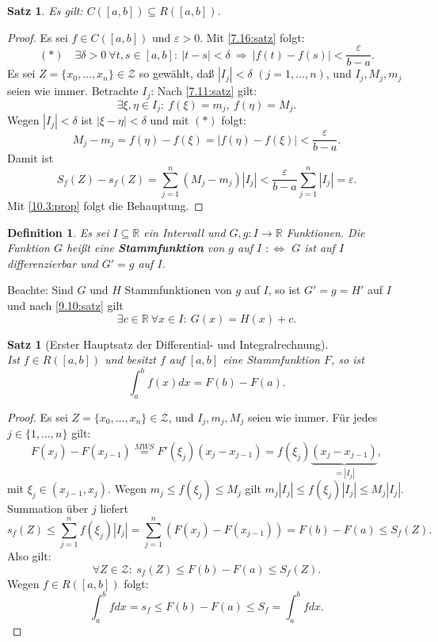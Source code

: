 \documentclass[12pt]{extreport} %
\newcommand{\R}{\mathbb{R}}
\theoremstyle{named}
\theoremstyle{itshape}
\newtheorem{satz}[unnamedtheorem]{Satz}
\newtheorem*{definition}{Definition}
\theoremstyle{normal}
\begin{document}
{\begin{satz} \label{10.5:satz}
	Es gilt: $C([a, b]) \subseteq R([a, b])$.
\end{satz}

\begin{proof}
	Es sei $f \in C([a, b])$ und $\varepsilon > 0$. Mit \ref{7.16:satz} folgt: 
	$$
	(\ast) \quad \exists \delta > 0~ \forall t, s \in [a, b]: ~ |t - s| < \delta ~ \Rightarrow  ~ |f(t) - f(s)| < \frac{\varepsilon}{b - a}.
	$$
	Es sei $Z = \{ x_{0}, \dotsc, x_{n} \} \in \mathcal{Z}$ so gewählt, da{\ss} $|I_{j}| < \delta$ $(j = 1, \dotsc, n)$, und $I_{j}, M_{j}, m_{j}$ seien wie immer.
	Betrachte $I_{j}$: Nach \ref{7.11:satz} gilt:
	$$ \exists \xi, \eta \in I_{j}: ~ f(\xi) = m_{j}, ~ f(\eta) = M_{j}. $$
	Wegen $|I_{j}| < \delta$ ist $|\xi - \eta| < \delta$ und mit $(\ast)$ folgt:
	$$ M_{j} - m_{j} = f(\eta) - f(\xi) = |f(\eta) - f(\xi)| < \frac{\varepsilon}{b - a}. $$
	Damit ist 
	$$S_{f}(Z) - s_{f}(Z) = \sum_{j=1}^{n} (M_{j} - m_{j}) |I_{j}| < \frac{\varepsilon}{b - a} \sum_{j=1}^{n} |I_{j}| = \varepsilon.$$
	Mit \ref{10.3:prop} folgt die Behauptung.
\end{proof}

\begin{definition}
	Es sei $I \subseteq \R$ ein Intervall und $G, g \colon I \rightarrow \R$ Funktionen. Die Funktion $G$ hei{\ss}t eine \textbf{Stammfunktion} von $g$ auf $I$ 
	$:\iff$ $G$ ist auf $I$ differenzierbar und $G' = g$ auf $I$.
\end{definition}


Beachte: Sind $G$ und $H$ Stammfunktionen von $g$ auf $I$, so ist $G' = g = H'$ auf $I$ und nach \ref{9.10:satz} gilt
$$\exists c \in \R ~ \forall x \in I: ~ G(x) = H(x) + c.$$

\begin{satz}[Erster Hauptsatz der Differential- und Integralrechnung]\label{10.6:prop-1Hauptsatz} ~\\
	Ist $f \in R([a, b])$ und besitzt $f$ auf $[a, b]$ eine Stammfunktion $F$, so ist 
	$$ \int_{a}^{b} f(x) dx = F(b) - F(a).$$
\end{satz}

\begin{proof}
	Es sei $Z = \{ x_{0}, \dotsc, x_{n} \} \in \mathcal{Z}$, und $I_{j}, m_{j}, M_{j}$ seien wie immer. Für jedes $j\in\{1,\dotsc, n\}$ gilt:
	$$ F(x_{j}) - F(x_{j-1}) \overset{MWS}{=} F'(\xi_{j}) (x_{j} - x_{j-1}) = f(\xi_{j}) \underbrace{(x_{j} - x_{j-1})}_{ = |I_{j}|}, $$
	mit $\xi_{j} \in (x_{j-1}, x_{j})$. Wegen $m_{j} \leq f(\xi_{j}) \leq M_{j}$ gilt $m_{j} |I_{j}| \leq f(\xi_{j}) |I_{j}| \leq M_{j} |I_{j}|$. 
	Summation über $j$ liefert
	$$
	s_{f}(Z)  \leq \sum_{j=1}^{n} f(\xi_{j}) |I_{j}|  = \sum_{j=1}^{n} \left( F(x_{j}) - F(x_{j-1}) \right) = F(b) - F(a) \leq S_{f}(Z).
	$$
	Also gilt: 
	$$ \forall Z \in \mathcal{Z}: ~ s_{f}(Z) \leq F(b) - F(a) \leq S_{f}(Z).$$ 
	Wegen $f \in R([a, b])$ folgt: $$\int_{a}^{b} f dx = s_{f} \leq F(b) - F(a) \leq S_{f} = \int_{a}^{b} f dx.$$
\end{proof}

}
\end{document}
